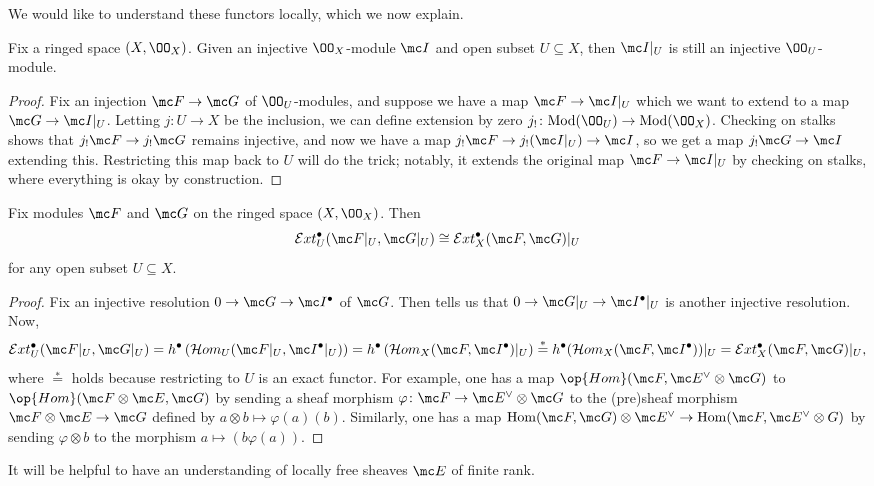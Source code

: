\documentclass[../notes.tex]{subfiles}
\begin{document}
We would like to understand these functors locally, which we now explain.
\begin{lemma} \label{lem:restrict-injective-open}
	Fix a ringed space $(X,\OO_X)$. Given an injective $\OO_X$-module $\mc I$ and open subset $U\subseteq X$, then $\mc I|_U$ is still an injective $\OO_U$-module.
\end{lemma}
\begin{proof}
	Fix an injection $\mc F\to\mc G$ of $\OO_U$-modules, and suppose we have a map $\mc F\to\mc I|_U$ which we want to extend to a map $\mc G\to\mc I|_U$. Letting $j\colon U\to X$ be the inclusion, we can define extension by zero $j_!\colon\mathrm{Mod}(\OO_U)\to\mathrm{Mod}(\OO_X)$. Checking on stalks shows that $j_!\mc F\to j_!\mc G$ remains injective, and now we have a map $j_!\mc F\to j_!(\mc I|_U)\to\mc I$, so we get a map $j_!\mc G\to\mc I$ extending this. Restricting this map back to $U$ will do the trick; notably, it extends the original map $\mc F\to\mc I|_U$ by checking on stalks, where everything is okay by construction.
\end{proof}
\begin{proposition}
	Fix modules $\mc F$ and $\mc G$ on the ringed space $(X,\OO_X)$. Then
	\[\mathcal Ext^\bullet_U(\mc F|_U,\mc G|_U)\cong\mathcal Ext^\bullet_X(\mc F,\mc G)|_U\]
	for any open subset $U\subseteq X$.
\end{proposition}
\begin{proof}
	Fix an injective resolution $0\to\mc G\to\mc I^\bullet$ of $\mc G$. Then  tells us that $0\to\mc G|_U\to\mc I^\bullet|_U$ is another injective resolution. Now,
	\[\mathcal Ext^\bullet_U(\mc F|_U,\mc G|_U)=h^\bullet\left(\mathcal Hom_U(\mc F|_U,\mc I^\bullet|_U)\right)=h^\bullet\left(\mathcal Hom_X(\mc F,\mc I^\bullet)|_U\right)\stackrel*=h^\bullet(\mathcal Hom_X(\mc F,\mc I^\bullet))|_U=\mathcal Ext_X^\bullet(\mc F,\mc G)|_U,\]
	where $\stackrel*=$ holds because restricting to $U$ is an exact functor. For example, one has a map $\op{Hom}(\mc F,\mc E^\lor\otimes\mc G)$ to $\op{Hom}(\mc F\otimes\mc E,\mc G)$ by sending a sheaf morphism $\varphi\colon\mc F\to\mc E^\lor\otimes\mc G$ to the (pre)sheaf morphism $\mc F\otimes\mc E\to\mc G$ defined by $a\otimes b\mapsto\varphi(a)(b)$. Similarly, one has a map $\mathrm{Hom}(\mc F,\mc G)\otimes\mc E^\lor\to\mathrm{Hom}(\mc F,\mc E^\lor\otimes G)$ by sending $\varphi\otimes b$ to the morphism $a\mapsto(b\varphi(a))$.
\end{proof}
It will be helpful to have an understanding of locally free sheaves $\mc E$ of finite rank.
\end{document}
